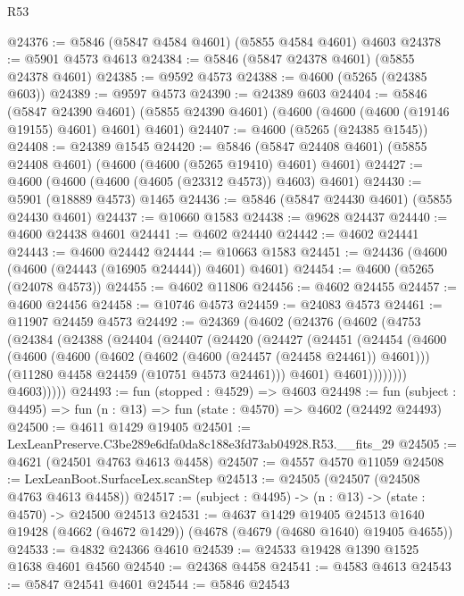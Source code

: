 \begin{lexlean}{R53}
\begin{coremodule}
@24376 := @5846 (@5847 @4584 @4601) (@5855 @4584 @4601) @4603
@24378 := @5901 @4573 @4613
@24384 := @5846 (@5847 @24378 @4601) (@5855 @24378 @4601)
@24385 := @9592 @4573
@24388 := @4600 (@5265 (@24385 @603))
@24389 := @9597 @4573
@24390 := @24389 @603
@24404 := @5846
    (@5847 @24390 @4601)
    (@5855 @24390 @4601)
    (@4600 (@4600 (@4600 (@19146 @19155) @4601) @4601) @4601)
@24407 := @4600 (@5265 (@24385 @1545))
@24408 := @24389 @1545
@24420 := @5846 (@5847 @24408 @4601) (@5855 @24408 @4601) (@4600 (@4600 (@5265 @19410) @4601) @4601)
@24427 := @4600 (@4600 (@4600 (@4605 (@23312 @4573)) @4603) @4601)
@24430 := @5901 (@18889 @4573) @1465
@24436 := @5846 (@5847 @24430 @4601) (@5855 @24430 @4601)
@24437 := @10660 @1583
@24438 := @9628 @24437
@24440 := @4600 @24438 @4601
@24441 := @4602 @24440
@24442 := @4602 @24441
@24443 := @4600 @24442
@24444 := @10663 @1583
@24451 := @24436 (@4600 (@4600 (@24443 (@16905 @24444)) @4601) @4601)
@24454 := @4600 (@5265 (@24078 @4573))
@24455 := @4602 @11806
@24456 := @4602 @24455
@24457 := @4600 @24456
@24458 := @10746 @4573
@24459 := @24083 @4573
@24461 := @11907 @24459 @4573
@24492 := @24369
    (@4602
      (@24376
        (@4602
          (@4753
            (@24384
              (@24388
                (@24404
                  (@24407
                    (@24420
                      (@24427
                        (@24451
                          (@24454
                            (@4600
                              (@4600
                                (@4600
                                  (@4602 (@4602 (@4600 (@24457 (@24458 @24461)) @4601)))
                                  (@11280 @4458 @24459 (@10751 @4573 @24461)))
                                @4601)
                              @4601))))))))
              @4603)))))
@24493 := fun (stopped : @4529) => @4603
@24498 := fun (subject : @4495) => fun (n : @13) => fun (state : @4570) => @4602 (@24492 @24493)
@24500 := @4611 @1429 @19405
@24501 := LexLeanPreserve.C3be289e6dfa0da8c188e3fd73ab04928.R53.__fits_29
@24505 := @4621 (@24501 @4763 @4613 @4458)
@24507 := @4557 @4570 @11059
@24508 := LexLeanBoot.SurfaceLex.scanStep
@24513 := @24505 (@24507 (@24508 @4763 @4613 @4458))
@24517 := (subject : @4495) -> (n : @13) -> (state : @4570) -> @24500 @24513
@24531 := @4637
    @1429
    @19405
    @24513
    @1640
    @19428
    (@4662 (@4672 @1429))
    (@4678 (@4679 (@4680 @1640) @19405 @4655))
@24533 := @4832 @24366 @4610
@24539 := @24533 @19428 @1390 @1525 @1638 @4601 @4560
@24540 := @24368 @4458
@24541 := @4583 @4613
@24543 := @5847 @24541 @4601
@24544 := @5846 @24543

\end{coremodule}
\end{lexlean}
